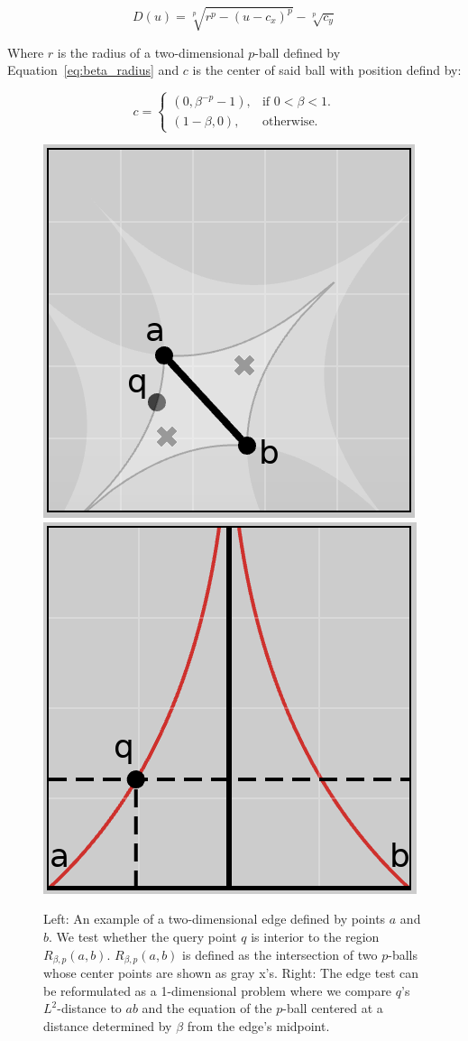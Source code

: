\begin{equation}
    \label{eq:beta_parameterization}
    D(u) = \sqrt[p]{r^{p} - (u - c_x)^p} - \sqrt[p]{c_y}
\end{equation}

Where $r$ is the radius of a two-dimensional $p$-ball defined by Equation~\ref{eq:beta_radius} and $c$ is the center of said ball with position defind by:

\begin{equation}
    c =
    \begin{cases}
        \left(0, \beta^{-p} - 1\right), & \text{if $0 < \beta < 1$}.\\
       \left(1-\beta, 0\right), & \text{otherwise}.
    \end{cases}
\end{equation}

\begin{figure}[htbp]
    \includegraphics[width=0.48\linewidth]{figs/chap7/bskeleton.png}
    \includegraphics[width=0.48\linewidth]{figs/chap7/bskeletonParameter.png}
    \caption{Left: An example of a two-dimensional edge defined by points $a$ and $b$.
    We test whether the query point $q$ is interior to the region $R_{\beta,p}(a,b)$.
    $R_{\beta,p}(a,b)$ is defined as the intersection of two $p$-balls whose center points are shown as gray x's.
    Right: The edge test can be reformulated as a 1-dimensional problem where we compare $q$'s $L^2$-distance to $ab$ and the equation of the $p$-ball centered at a distance determined by $\beta$ from the edge's midpoint.}
    \label{fig:gabriel_p_shapes}
\end{figure}

